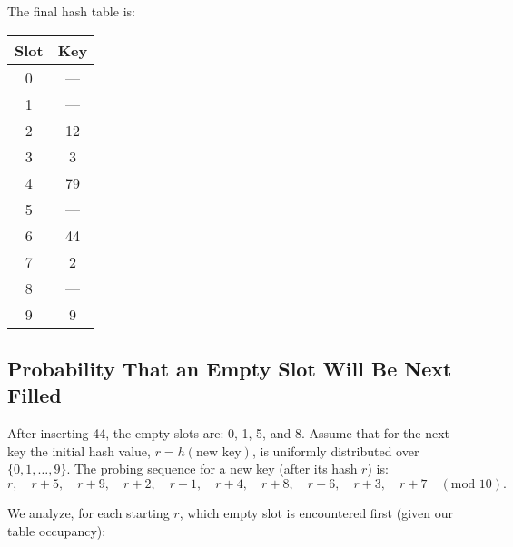 \documentclass{article}
\begin{document}
The final hash table is:

\bigskip
\begin{center}
\begin{tabular}{c|c}
\textbf{Slot} & \textbf{Key} \\ \midrule
0 & --- \\
1 & --- \\
2 & 12 \\
3 & 3 \\
4 & 79 \\
5 & --- \\
6 & 44 \\
7 & 2 \\
8 & --- \\
9 & 9 \\
\end{tabular}
\end{center}
\bigskip

\subsection*{Probability That an Empty Slot Will Be Next Filled}

After inserting 44, the empty slots are: 0, 1, 5, and 8. Assume that for the next key the initial hash value, \(r=h(\text{new key})\), is uniformly distributed over \(\{0,1,\ldots,9\}\). The probing sequence for a new key (after its hash \(r\)) is:
\[
r,\quad r+5,\quad r+9,\quad r+2,\quad r+1,\quad r+4,\quad r+8,\quad r+6,\quad r+3,\quad r+7\quad (\text{mod }10).
\]

We analyze, for each starting \(r\), which empty slot is encountered first (given our table occupancy):
\end{document}
